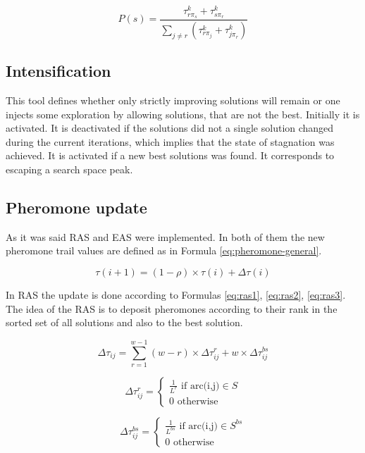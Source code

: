 \documentclass[12pt]{article}
\begin{document}
\begin{equation}
P(s) = \frac{\tau_{r\pi_s}^k + \tau_{s\pi_r}^k}{\sum_{j \ne r} (\tau_{r\pi_j}^k + \tau_{j\pi_r}^k)}
\label{eq:explorative}
\end{equation}

\subsection{Intensification}

This tool defines whether only strictly improving solutions will remain or one injects some exploration by allowing solutions, that are not the best. Initially it is activated. It is deactivated if the solutions did not a single solution changed during the current iterations, which implies that the state of stagnation was achieved. It is activated if a new best solutions was found. It corresponds to escaping a search space peak.

\subsection{Pheromone update}

As it was said RAS and EAS were implemented. In both of them the new pheromone trail values are defined as in Formula \ref{eq:pheromone-general}.

\begin{equation}
\tau(i+1) = (1-\rho) \times \tau(i) + \Delta\tau(i)
\label{eq:pheromone-general}
\end{equation}

In RAS the update is done according to Formulas \ref{eq:ras1}, \ref{eq:ras2}, \ref{eq:ras3}. The idea of the RAS is to deposit pheromones according to their rank in the sorted set of all solutions and also to the best solution.

\begin{equation}
\Delta\tau_{ij} = \sum_{r=1}^{w-1} (w-r) \times \Delta \tau_{ij}^r + w \times \Delta \tau_{ij}^{bs}
\label{eq:ras1}
\end{equation}

\begin{equation}
\Delta\tau_{ij}^r = \begin{cases}
    \frac{1}{L^r} \text{ if arc(i,j)} \in S\\
    0 \text{ otherwise}
  \end{cases}
\label{eq:ras2}
\end{equation}

\begin{equation}
\Delta\tau_{ij}^{bs} = \begin{cases}
    \frac{1}{L^{bs}} \text{ if arc(i,j)} \in S^{bs}\\
    0 \text{ otherwise}
  \end{cases}
\label{eq:ras3}
\end{equation}
\end{document}
